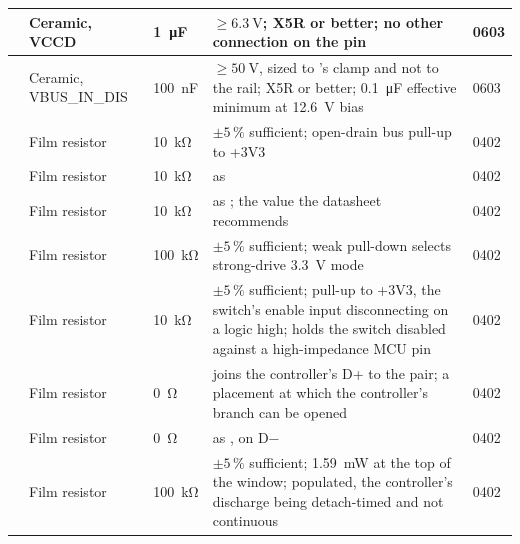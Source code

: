 {\begin{longtable}{|L{0.10\textwidth}|L{0.14\textwidth}|L{0.11\textwidth}|L{0.33\textwidth}|L{0.12\textwidth}|}
\hline
{} & Ceramic, VCCD & \SI{1}{\micro\farad} & $\geq\SI{6.3}{\volt}$; X5R or better; no other connection on the pin & 0603 \\
\hline
{} & Ceramic, VBUS\_IN\_DIS & \SI{100}{\nano\farad} & $\geq\SI{50}{\volt}$, sized to 's clamp and not to the rail; X5R or better; \SI{0.1}{\micro\farad} effective minimum at \SI{12.6}{\volt} bias & 0603 \\
\hline
{} & Film resistor & \SI{10}{\kilo\ohm} & $\pm5\,\%$ sufficient; open-drain bus pull-up to +3V3 & 0402 \\
\hline
{} & Film resistor & \SI{10}{\kilo\ohm} & as  & 0402 \\
\hline
{} & Film resistor & \SI{10}{\kilo\ohm} & as ; the value the datasheet recommends & 0402 \\
\hline
{} & Film resistor & \SI{100}{\kilo\ohm} & $\pm5\,\%$ sufficient; weak pull-down selects strong-drive \SI{3.3}{\volt} mode & 0402 \\
\hline
{} & Film resistor & \SI{10}{\kilo\ohm} & $\pm5\,\%$ sufficient; pull-up to +3V3, the switch's enable input disconnecting on a logic high; holds the switch disabled against a high-impedance MCU pin & 0402 \\
\hline
{} & Film resistor & \SI{0}{\ohm} & joins the controller's D+ to the pair; a placement at which the controller's branch can be opened & 0402 \\
\hline
{} & Film resistor & \SI{0}{\ohm} & as , on D$-$ & 0402 \\
\hline
{} & Film resistor & \SI{100}{\kilo\ohm} & $\pm5\,\%$ sufficient; \SI{1.59}{\milli\watt} at the top of the window; populated, the controller's discharge being detach-timed and not continuous & 0402 \\
\hline
\end{longtable}
}
